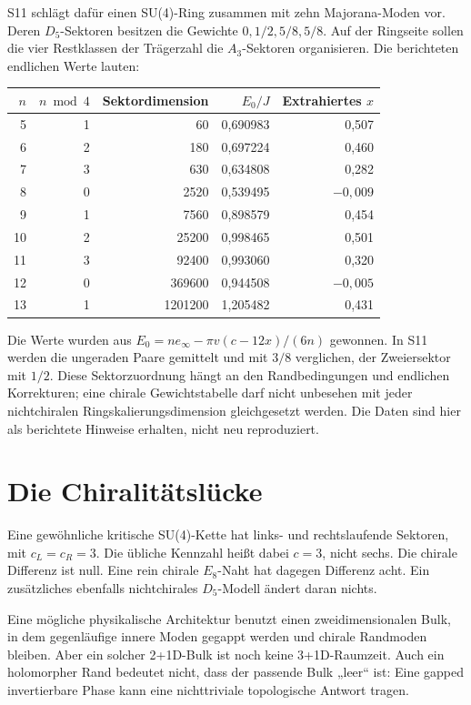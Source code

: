 S11 schlägt dafür einen SU(4)-Ring zusammen mit zehn Majorana-Moden vor. Deren $D_5$-Sektoren besitzen die Gewichte $0,1/2,5/8,5/8$. Auf der Ringseite sollen die vier Restklassen der Trägerzahl die $A_3$-Sektoren organisieren. Die berichteten endlichen Werte lauten:
\begin{center}
\begin{tabular}{rrrrr}
\toprule $n$&$n\bmod4$&Sektordimension&$E_0/J$&Extrahiertes $x$\\\midrule
5&1&60&0,690983&0,507\\
6&2&180&0,697224&0,460\\
7&3&630&0,634808&0,282\\
8&0&2520&0,539495&$-0,009$\\
9&1&7560&0,898579&0,454\\
10&2&25200&0,998465&0,501\\
11&3&92400&0,993060&0,320\\
12&0&369600&0,944508&$-0,005$\\
13&1&1201200&1,205482&0,431\\\bottomrule
\end{tabular}
\end{center}
Die Werte wurden aus $E_0=ne_\infty-\pi v(c-12x)/(6n)$ gewonnen. In S11 werden die ungeraden Paare gemittelt und mit $3/8$ verglichen, der Zweiersektor mit $1/2$. Diese Sektorzuordnung hängt an den Randbedingungen und endlichen Korrekturen; eine chirale Gewichtstabelle darf nicht unbesehen mit jeder nichtchiralen Ringskalierungsdimension gleichgesetzt werden. Die Daten sind hier als berichtete Hinweise erhalten, nicht neu reproduziert.

\section{Die Chiralitätslücke}
Eine gewöhnliche kritische SU(4)-Kette hat links- und rechtslaufende Sektoren, mit $c_L=c_R=3$. Die übliche Kennzahl heißt dabei $c=3$, nicht sechs. Die chirale Differenz ist null. Eine rein chirale $E_8$-Naht hat dagegen Differenz acht. Ein zusätzliches ebenfalls nichtchirales $D_5$-Modell ändert daran nichts.

Eine mögliche physikalische Architektur benutzt einen zweidimensionalen Bulk, in dem gegenläufige innere Moden gegappt werden und chirale Randmoden bleiben. Aber ein solcher 2+1D-Bulk ist noch keine 3+1D-Raumzeit. Auch ein holomorpher Rand bedeutet nicht, dass der passende Bulk „leer“ ist: Eine gapped invertierbare Phase kann eine nichttriviale topologische Antwort tragen.


